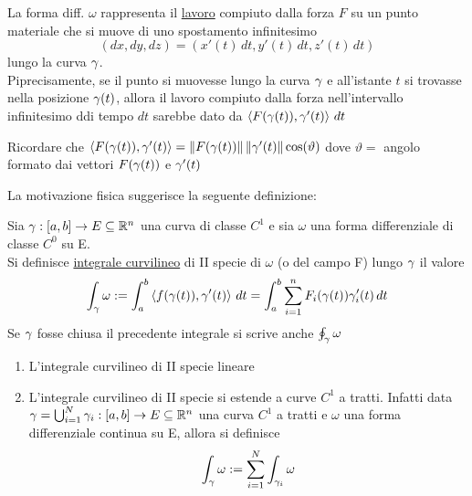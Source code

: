 La forma diff. $\omega$ rappresenta il \underline{lavoro} compiuto dalla forza 
$F$ su un punto materiale che si muove di uno spostamento infinitesimo 
$$(dx,dy,dz) =(x'(t)\,dt,y'(t)\,dt,z'(t)\,dt) $$ 
lungo la curva $\gamma$. \\
Pi\acu precisamente, se il punto si muovesse lungo la curva $\gamma$ e all'istante $t$ si trovasse
nella posizione $\gamma(t)$, allora il lavoro compiuto dalla forza nell'intervallo infinitesimo ddi tempo 
$dt$ sarebbe dato da $\left\langle F(\gamma(t)),\gamma'(t) \right\rangle\,dt$
\begin{osservazione}
  Ricordare che $\left\langle F(\gamma(t)),\gamma'(t) \right\rangle = \left\lVert F(\gamma(t))\right\rVert\left\lVert\gamma'(t)\right\rVert\cos(\vartheta)$
  dove $\vartheta = $ angolo formato dai vettori $F(\gamma(t))$ e $\gamma'(t)$
\end{osservazione}
La motivazione fisica suggerisce la seguente definizione:
\begin{definition}
  Sia $\gamma:[a,b]\to E\subseteq\mathbb{R}^n$ una curva di classe $C^1$ e sia
  $\omega$ una forma differenziale di classe $C^0$ su E. \\
  Si definisce \underline{integrale curvilineo} di II specie di $\omega$
  (o del campo F) lungo $\gamma$ il valore 
  $$\int_{\gamma} \omega := \int_{a}^{b} \left\langle f(\gamma(t)), \gamma'(t) \right\rangle\,dt = 
    \int_{a}^{b} \sum_{i=1}^{n} F_i(\gamma(t))\gamma_i'(t) \,dt$$
  Se $\gamma$ fosse chiusa il precedente integrale si scrive anche $\oint_{\gamma} \omega$
\end{definition}
\begin{osservazione}
  \begin{enumerate}
    \item L'integrale curvilineo di II specie \ace lineare
    \item L'integrale curvilineo di II specie si estende a curve $C^1$ a tratti. Infatti
          data $\gamma = \bigcup_{i=1}^{N}\gamma_i :[a,b]\to E\subseteq\mathbb{R}^n$ una curva $C^1$ a tratti
          e $\omega$ una forma differenziale continua su E, allora si definisce
          $$\int_{\gamma} \omega := \sum_{i=1}^{N} \int_{\gamma_i}\omega$$
  \end{enumerate}
\end{osservazione}